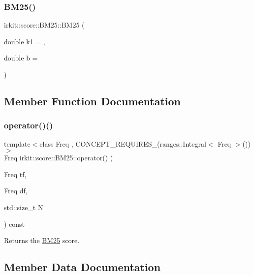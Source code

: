 \subsubsection{\texorpdfstring{B\+M25()}{BM25()}}
{\footnotesize\ttfamily irkit\+::score\+::\+B\+M25\+::\+B\+M25 (\begin{DoxyParamCaption}\item[{double}]{k1 = {},  }\item[{double}]{b = {} }\end{DoxyParamCaption})\hspace{0.3cm}{\ttfamily [inline]}}



\subsection{Member Function Documentation}
\mbox{\label{structirkit_1_1score_1_1BM25_a11129a12cf8c95384d6ceb23b68f39ed}} 
\subsubsection{\texorpdfstring{operator()()}{operator()()}}
{\footnotesize\ttfamily template$<$class Freq , C\+O\+N\+C\+E\+P\+T\+\_\+\+R\+E\+Q\+U\+I\+R\+E\+S\+\_\+(ranges\+::\+Integral$<$ Freq $>$()) $>$ \\
Freq irkit\+::score\+::\+B\+M25\+::operator() (\begin{DoxyParamCaption}\item[{Freq}]{tf,  }\item[{Freq}]{df,  }\item[{std\+::size\+\_\+t}]{N }\end{DoxyParamCaption}) const\hspace{0.3cm}{\ttfamily [inline]}}



Returns the \mbox{\hyperlink{structirkit_1_1score_1_1BM25}{B\+M25}} score. 



\subsection{Member Data Documentation}
\mbox{\label{structirkit_1_1score_1_1BM25_ab68733f61f341e9fe744540192ae5b7c}} 
